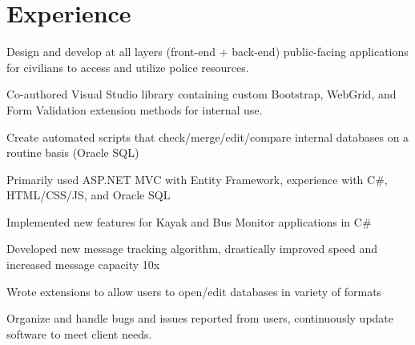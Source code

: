 \documentclass[letterpaper]{deedy-resume} %
\begin{document}
\hfill
%
%
\begin{minipage}[t]{0.66\textwidth} %


\section{Experience}


\vspace{\topsep} %
\begin{tightitemize}
\item Design and develop at all layers (front-end + back-end) public-facing applications for civilians to access and utilize police resources.  
\item Co-authored Visual Studio library containing custom Bootstrap, WebGrid, and Form Validation extension methods for internal use.
\item Create automated scripts that check/merge/edit/compare internal databases on a routine basis (Oracle SQL)
\item Primarily used ASP.NET MVC with Entity Framework, experience with C\#, HTML/CSS/JS, and Oracle SQL
\end{tightitemize}

\sectionspace %


\begin{tightitemize}
\item Implemented new features for Kayak and Bus Monitor applications in C\#
\item Developed new message tracking algorithm, drastically improved speed and increased message capacity 10x 
\item Wrote extensions to allow users to open/edit databases in variety of formats
\item Organize and handle bugs and issues reported from users, continuously update software to meet client needs.
\end{tightitemize}


\end{minipage}
\end{document}
